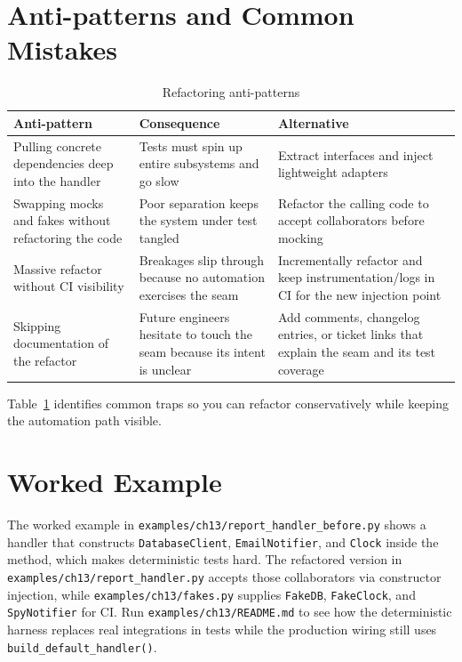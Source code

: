 \section{Anti-patterns and Common Mistakes}
\begin{table}[h]
\centering
\caption{Refactoring anti-patterns}
\label{tab:refactor-antipatterns}
\begin{tabular}{p{4cm}p{4cm}p{5cm}}
\toprule
Anti-pattern & Consequence & Alternative \\
\midrule
Pulling concrete dependencies deep into the handler & Tests must spin up entire subsystems and go slow & Extract interfaces and inject lightweight adapters \\
Swapping mocks and fakes without refactoring the code & Poor separation keeps the system under test tangled & Refactor the calling code to accept collaborators before mocking \\
Massive refactor without CI visibility & Breakages slip through because no automation exercises the seam & Incrementally refactor and keep instrumentation/logs in CI for the new injection point \\
Skipping documentation of the refactor & Future engineers hesitate to touch the seam because its intent is unclear & Add comments, changelog entries, or ticket links that explain the seam and its test coverage \\
\bottomrule
\end{tabular}
\end{table}

Table~\ref{tab:refactor-antipatterns} identifies common traps so you can refactor conservatively while keeping the automation path visible.

\section{Worked Example}
The worked example in \texttt{examples/ch13/report\_handler\_before.py} shows a handler that constructs \texttt{DatabaseClient}, \texttt{EmailNotifier}, and \texttt{Clock} inside the method, which makes deterministic tests hard. The refactored version in \texttt{examples/ch13/report\_handler.py} accepts those collaborators via constructor injection, while \texttt{examples/ch13/fakes.py} supplies \texttt{FakeDB}, \texttt{FakeClock}, and \texttt{SpyNotifier} for CI. Run \texttt{examples/ch13/README.md} to see how the deterministic harness replaces real integrations in tests while the production wiring still uses \texttt{build\_default\_handler()}.

